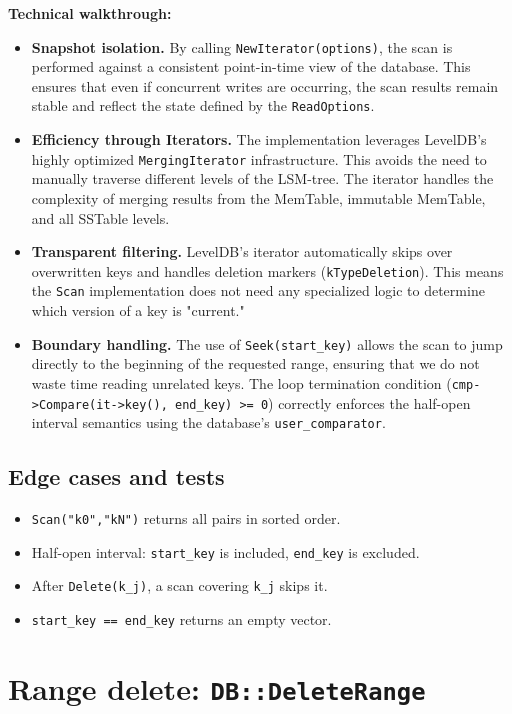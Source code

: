 \documentclass[11pt,a4paper]{article}
\newcommand{\fname}[1]{\textcolor{primary!85!black}{\texttt{#1}}}
\newcommand{\sym}[1]{\texttt{#1}}
\begin{document}
\textbf{Technical walkthrough:}
\begin{itemize}[leftmargin=1.4em,itemsep=3pt]
    \item \textbf{Snapshot isolation.} By calling \fname{NewIterator(options)}, the scan is performed against a consistent point-in-time view of the database. This ensures that even if concurrent writes are occurring, the scan results remain stable and reflect the state defined by the \sym{ReadOptions}.
    \item \textbf{Efficiency through Iterators.} The implementation leverages LevelDB's highly optimized \fname{MergingIterator} infrastructure. This avoids the need to manually traverse different levels of the LSM-tree. The iterator handles the complexity of merging results from the MemTable, immutable MemTable, and all SSTable levels.
    \item \textbf{Transparent filtering.} LevelDB's iterator automatically skips over overwritten keys and handles deletion markers (\fname{kTypeDeletion}). This means the \sym{Scan} implementation does not need any specialized logic to determine which version of a key is "current."
    \item \textbf{Boundary handling.} The use of \sym{Seek(start\_key)} allows the scan to jump directly to the beginning of the requested range, ensuring that we do not waste time reading unrelated keys. The loop termination condition (\fname{cmp->Compare(it->key(), end\_key) >= 0}) correctly enforces the half-open interval semantics using the database's \fname{user\_comparator}.
\end{itemize}

\subsection{Edge cases and tests}
\begin{itemize}[leftmargin=1.4em,itemsep=2pt]
    \item \sym{Scan("k0","kN")} returns all pairs in sorted order.
    \item Half-open interval: \sym{start\_key} is included, \sym{end\_key} is excluded.
    \item After \sym{Delete(k\_j)}, a scan covering \sym{k\_j} skips it.
    \item \sym{start\_key == end\_key} returns an empty vector.
\end{itemize}

\newpage
\section{Range delete: \texttt{DB::DeleteRange}}\label{sec:dr}
\end{document}
